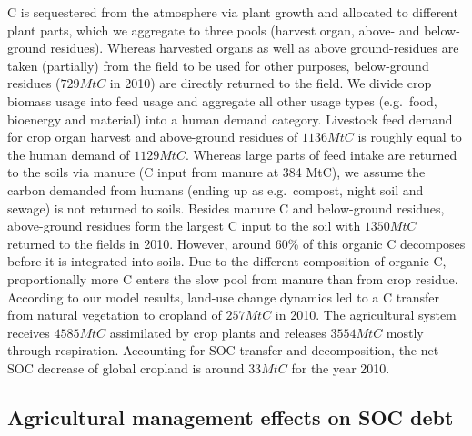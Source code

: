 \documentclass[gc, manuscript]{copernicus}
\begin{document}
C is sequestered from the atmosphere via plant growth and allocated to different plant parts, which we aggregate to three pools (harvest organ, above- and below-ground residues). Whereas harvested organs as well as above ground-residues are taken (partially) from the field to be used for other purposes, below-ground residues (\(729\unit{MtC}\) in 2010) are directly returned to the field. We divide crop biomass usage into feed usage and aggregate all other usage types (e.g.~food, bioenergy and material) into a human demand category. Livestock feed demand for crop organ harvest and above-ground residues of \(1136\unit{MtC}\) is roughly equal to the human demand of \(1129\unit{MtC}\). Whereas large parts of feed intake are returned to the soils via manure (C input from manure at 384 MtC), we assume the carbon demanded from humans (ending up as e.g.~compost, night soil and sewage) is not returned to soils. Besides manure C and below-ground residues, above-ground residues form the largest C input to the soil with \(1350\unit{MtC}\) returned to the fields in 2010. However, around 60\% of this organic C decomposes before it is integrated into soils. Due to the different composition of organic C, proportionally more C enters the slow pool from manure than from crop residue.
According to our model results, land-use change dynamics led to a C transfer from natural vegetation to cropland of \(257\unit{MtC}\) in 2010. The agricultural system receives \(4585\unit{MtC}\) assimilated by crop plants and releases \(3554\unit{MtC}\) mostly through respiration. Accounting for SOC transfer and decomposition, the net SOC decrease of global cropland is around \(33\unit{MtC}\) for the year 2010.

\hypertarget{agricultural-management-effects-on-soc-debt}{%
\subsection{Agricultural management effects on SOC debt}\label{agricultural-management-effects-on-soc-debt}}
\end{document}
